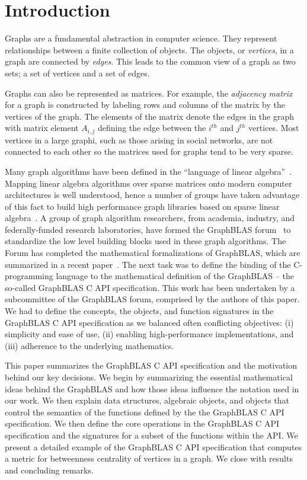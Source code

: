 \section{Introduction}
\label{sec:intro}

Graphs are a fundamental abstraction in computer science.  They represent
relationships between a finite collection of objects.   The objects, or
\emph{vertices}, in a graph are connected by \emph{edges}.  This leads
to the common view of a graph as two sets;  a set of vertices and a set
of edges.

Graphs can also be represented as matrices.   For example, the
\emph{adjacency matrix} for a graph is constructed by labeling rows and
columns of the matrix by the vertices of the graph.  The elements of
the matrix denote the edges in the graph with matrix element $A_{i,j}$
defining the edge between the $i^{th}$ and $j^{th}$ vertices.  Most
vertices in a large graphi, such as those arising in social networks,
are not connected to each other so the matrices used for graphs tend to
be very sparse.

Many graph algorithms have been defined in the ``language of linear
algebra''~\cite{kepner2011graph}.  Mapping linear algebra algorithms over
sparse matrices onto modern computer architectures is well understood,
hence a number of groups have taken advantage of this fact to build high
performance graph libraries based on sparse linear algebra~\cite{combblas,
gadepally2015graphulo, gpi2016, sundaram2015graphmat}.  A group
of graph algorithm researchers, from academia, industry, and
federally-funded research laboratories, have formed the GraphBLAS
forum~\cite{graphblas_web} to standardize the low level building
blocks used in these graph algorithms.  The Forum has completed the
mathematical formalizations of GraphBLAS, which are summarized in a
recent paper~\cite{mathgraphblas16}.  The next task was to define the
binding of the C-programming language to the mathematical definition of
the GraphBLAS -- the so-called GraphBLAS C API specification.   This work
has been undertaken by a subcommittee of the GraphBLAS forum, comprised by
the authors of this paper.  We had to define the concepts, the objects,
and function signatures in the GraphBLAS C API specification as we
balanced often conflicting objectives: (i) simplicity and ease of use,
(ii) enabling high-performance implementations, and (iii) adherence to
the underlying mathematics.

This paper summarizes the GraphBLAS C API specification and the
motivation behind our key decisions.  We begin by summarizing the
essential mathematical ideas behind the GraphBLAS and how those ideas
influence the notation used in our work.  We then explain data structures,
algebraic objects, and objects that control the semantics of the functions
defined by the the GraphBLAS C API specification.   We then define the
core operations in the GraphBLAS C API specification and the signatures
for a subset of the functions  within the API.  We present a detailed
example of the GraphBLAS C API specification that computes a metric for
betweenness centrality of vertices in a graph.  We close with results
and concluding remarks.
